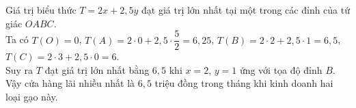 \begin{ex}
{\begin{center}
		\end{center}
		Giá trị biểu thức $T = 2x + 2{,}5y$ đạt giá trị lớn nhất tại một trong các đỉnh của tứ giác $OABC$.\\
		Ta có $T(O) = 0$, $T(A) = 2 \cdot 0 + 2{,}5 \cdot \dfrac{5}{2} = 6{,}25$, $T(B) = 2 \cdot 2 + 2{,}5 \cdot 1 = 6{,}5$, $T(C) = 2 \cdot 3 + 2{,}5 \cdot 0 = 6$.\\
		Suy ra $T$ đạt giá trị lớn nhất bằng $6{,}5$ khi $x = 2$, $y = 1$ ứng với tọa độ đỉnh $B$.\\
		Vậy cửa hàng lãi nhiều nhất là $6{,}5$ triệu đồng trong tháng khi kinh doanh hai loại gạo này.
	}
\end{ex}

